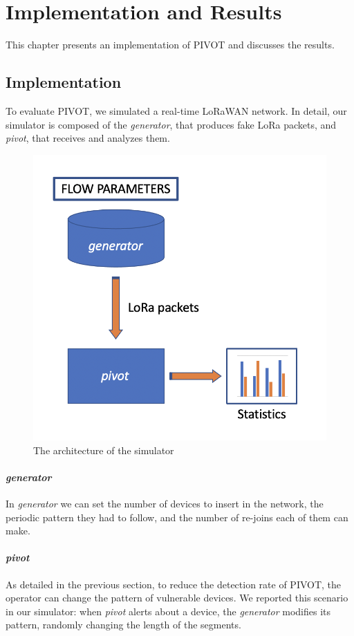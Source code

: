 \chapter{Implementation and Results}
\label{implementation}
This chapter presents an implementation of PIVOT and discusses the results. 

\section{Implementation}
\label{implementation_2}
To evaluate PIVOT, we simulated a real-time LoRaWAN network. In detail, our simulator is composed of the \textit{generator}, that produces fake LoRa packets, and \textit{pivot}, that receives and analyzes them.

\begin{figure}
    \centering
    \includegraphics[width=0.5\linewidth]{images/implementation/simulator.png}
    \caption{The architecture of the simulator}
    \label{fig:simulator}
\end{figure}

\subsubsection{\textit{generator}}
In \textit{generator} we can set the number of devices to insert in the network, the periodic pattern they had to follow, and the number of re-joins each of them can make. 

\subsubsection{\textit{pivot}}
As detailed in the previous section, to reduce the detection rate of PIVOT, the operator can change the pattern of vulnerable devices. We reported this scenario in our simulator: when \textit{pivot} alerts about a device, the \textit{generator} modifies its pattern, randomly changing the length of the segments.

